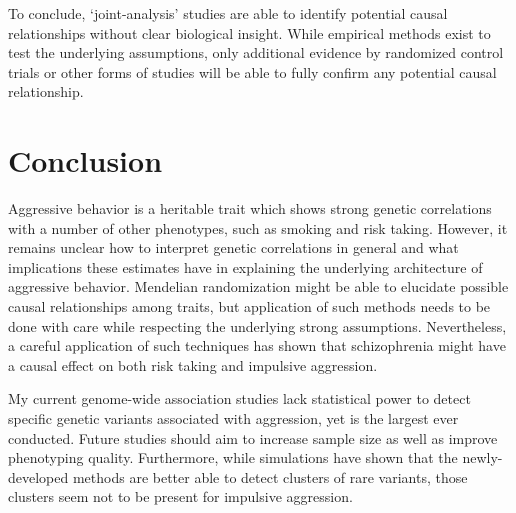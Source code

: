 To conclude, `joint-analysis' studies are able to identify potential causal relationships without clear biological insight.
While empirical methods exist to test the underlying assumptions, only additional evidence by randomized control trials or other forms of studies will be able to fully confirm any potential causal relationship.

\section{Conclusion}
\label{sec:conclusion}

Aggressive behavior is a heritable trait which shows strong genetic correlations with a number of other phenotypes, such as smoking and risk taking.
However, it remains unclear  how to interpret genetic correlations in general and what implications these estimates have in explaining the underlying architecture of aggressive behavior.
Mendelian randomization might be able to elucidate possible causal relationships among traits, but application of such methods needs to be done with care while respecting the underlying strong assumptions. 
Nevertheless, a careful application of such techniques has shown that schizophrenia might have a causal effect on both risk taking and impulsive aggression.

My current genome-wide association studies lack statistical power to detect specific genetic variants associated with aggression, yet is the largest ever conducted.
Future studies should aim to increase sample size as well as improve phenotyping quality.
Furthermore, while simulations have shown that the newly-developed methods are better able to detect clusters of rare variants, those clusters seem not to be present for impulsive aggression.
